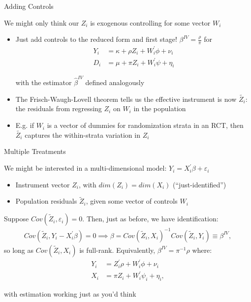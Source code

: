\documentclass{beamer}
\begin{document}

\begin{frame}{Adding Controls}

We might only think our $Z_i$ is exogenous controlling for some vector $W_i$
\begin{itemize}
\item Just add controls to the reduced form and first stage! $\beta^{IV}=\frac{\rho}{\pi}$ for
\vspace{-0.3cm}
\begin{align*}
Y_i &= \kappa+ \rho Z_i + W_i^\prime\phi +  \nu_i \\
D_i &= \mu +\pi Z_i + W_i^\prime\psi + \eta_i
\end{align*}

\vspace{-0.2cm}
with the estimator $\hat\beta^{IV}$ defined analogously \pause{}\medskip
\item The Frisch-Waugh-Lovell theorem tells us the effective instrument is now $\tilde{Z_i}$: the residuals from regressing $Z_i$ on $W_i$ in the population\pause{}\medskip
\item E.g. if $W_i$ is a vector of dummies for randomization strata in an RCT, then $\tilde{Z_i}$ captures the within-strata variation in $Z_i$
\end{itemize}
\end{frame}

\begin{frame}{Multiple Treatments}

We might be interested in a multi-dimensional model: $Y_i=X_i^\prime\beta+\varepsilon_i$
\begin{itemize}
\item Instrument vector $Z_i$, with $dim(Z_i)=dim(X_i)$ (``just-identified'')
\item Population residuals $\tilde{Z}_i$, given some vector of controls $W_i$
\end{itemize}\medskip\pause{}
Suppose $Cov(\tilde{Z}_i,\varepsilon_i)=0$. Then, just as before, we have identification:
\begin{align*}
Cov(\tilde{Z}_i,Y_i-X_i^\prime\beta)=0 \implies \beta = Cov(\tilde{Z}_i,X_i)^{-1}Cov(\tilde{Z}_i,Y_i)\equiv \beta^{IV},
\end{align*}
so long as $Cov(\tilde{Z}_i,X_i)$ is full-rank.\pause{} Equivalently, $\beta^{IV}=\pi^{-1}\rho$ where:
\vspace{-0.2cm}
\begin{align*}
Y_i&=Z_i^\prime\rho + W_i^\prime\phi+\nu_i\\
X_i&=\pi Z_i+W_i^\prime\psi_i+\eta_i,
\end{align*}

\vspace{-0.3cm}
with estimation working just as you'd think
\end{frame}
\end{document}
